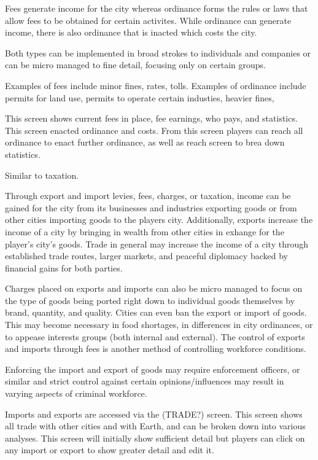 Fees generate income for the city whereas ordinance forms the rules or laws that allow fees to be obtained for certain activites. While ordinance can generate income, there is also ordinance that is inacted which costs the city.

Both types can be implemented in broad strokes to individuals and companies or can be micro managed to fine detail, focusing only on certain groups.

Examples of fees include minor fines, rates, tolls.
Examples of ordinance include permits for land use, permits to operate certain industies, heavier fines, 

This screen shows current fees in place, fee earnings, who pays, and statistics.
This screen enacted ordinance and costs. From this screen players can reach all ordinance to enact further ordinance, as well as reach screen to brea down statistics. 


Similar to taxation.


Through export and import levies, fees, charges, or taxation, income can be gained for the city from its businesses and industries exporting goods or from other cities importing goods to the players city. Additionally, exports increase the income of a city by bringing in wealth from other cities in exhange for the player's city's goods. Trade in general may increase the income of a city through established trade routes, larger markets, and peaceful diplomacy backed by financial gains for both parties. 

Charges placed on exports and imports can also be micro managed to focus on the type of goods being ported right down to individual goods themselves by brand, quantity, and quality. Cities can even ban the export or import of goods. This may become necessary in food shortages, in differences in city ordinances, or to appease interests groups (both internal and external). The control of exports and imports through fees is another method of controlling workforce conditions. 

Enforcing the import and export of goods may require enforcement officers, or similar and strict control against certain opinions/influences may result in varying aspects of criminal workforce.

Imports and exports are accessed via the (TRADE?) screen. This screen shows all trade with other cities and with Earth, and can be broken down into various analyses. This screen will initially show sufficient detail but players can click on any import or export to show greater detail and edit it. 

